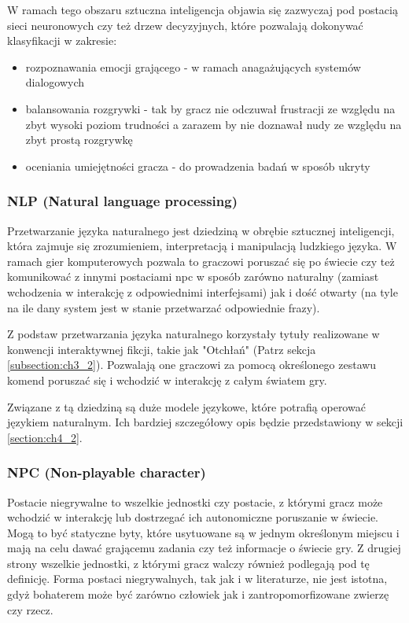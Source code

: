 W ramach tego obszaru sztuczna inteligencja objawia się zazwyczaj pod postacią sieci neuronowych czy
też drzew decyzyjnych, które pozwalają dokonywać klasyfikacji w zakresie\cite{reusable_game_ai}:

\begin{itemize}
    \item rozpoznawania emocji grającego - w ramach anagażujących systemów dialogowych
    \item balansowania rozgrywki - tak by gracz nie odczuwał frustracji ze względu na zbyt wysoki poziom
          trudności a zarazem by nie doznawał nudy ze względu na zbyt prostą rozgrywkę
    \item oceniania umiejętności gracza - do prowadzenia badań w sposób ukryty
\end{itemize}

\subsubsection*{NLP (Natural language processing)}

Przetwarzanie języka naturalnego jest dziedziną w obrębie sztucznej inteligencji, która zajmuje się
zrozumieniem, interpretacją i manipulacją ludzkiego języka\cite{reusable_game_ai}. W ramach gier
komputerowych pozwala to graczowi poruszać się po świecie czy też komunikować z innymi postaciami \gls{npc}
w sposób zarówno naturalny (zamiast wchodzenia w interakcję z odpowiednimi interfejsami) jak i dość
otwarty (na tyle na ile dany system jest w stanie przetwarzać odpowiednie frazy).

Z podstaw przetwarzania języka naturalnego korzystały tytuły realizowane w konwencji interaktywnej
fikcji, takie jak "Otchłań" (Patrz sekcja \ref{subsection:ch3_2}). Pozwalają one graczowi za pomocą
określonego zestawu komend poruszać się i wchodzić w interakcję z całym światem gry.

Związane z tą dziedziną są duże modele językowe, które potrafią operować językiem naturalnym.
Ich bardziej szczegółowy opis będzie przedstawiony w sekcji \ref{section:ch4_2}.

\subsubsection*{NPC (Non-playable character)}

Postacie niegrywalne to wszelkie jednostki czy postacie, z którymi gracz może wchodzić w
interakcję lub dostrzegać ich autonomiczne poruszanie w świecie. Mogą to być statyczne byty,
które usytuowane są w jednym określonym miejscu i mają na celu dawać grającemu zadania czy też
informacje o świecie gry. Z drugiej strony wszelkie jednostki, z którymi gracz walczy również
podlegają pod tę definicję. Forma postaci niegrywalnych, tak jak i w literaturze, nie jest
istotna, gdyż bohaterem może być zarówno człowiek jak i zantropomorfizowane zwierzę czy rzecz.

